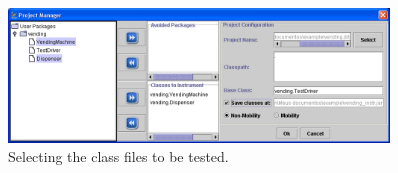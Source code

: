 \begin{figure}[!ht]
\begin{center}
\includegraphics[width=0.90\textwidth]{fig/project-manager}
\caption{\label{fig:project-manager}Selecting the class files to
be tested.}
\end{center}
\end{figure}
